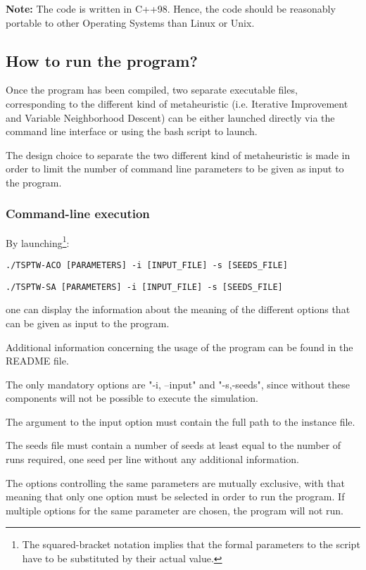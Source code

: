 \documentclass{article}
\begin{document}
\textbf{Note:} The code is written in C++98. Hence, the code should be
reasonably portable to other Operating Systems than Linux or Unix.

\subsection{How to run the program?}

Once the program has been compiled, two separate executable files,
corresponding to the different kind of metaheuristic (i.e. Iterative Improvement
and Variable Neighborhood Descent) can be either launched directly via the command line
interface or using the bash script to launch.

The design choice to separate the two different kind of metaheuristic is made in order to limit the number of command line parameters to be given as input to the program.

\subsubsection{Command-line execution}
By launching\footnote{The squared-bracket notation implies that the formal parameters to the script have to be substituted by their actual value.}:
\begin{center}
\begin{verbatim}
./TSPTW-ACO [PARAMETERS] -i [INPUT_FILE] -s [SEEDS_FILE]
\end{verbatim}
\begin{verbatim}
./TSPTW-SA [PARAMETERS] -i [INPUT_FILE] -s [SEEDS_FILE]
\end{verbatim}
\end{center}

one can display the information about the meaning of the different options that can be given as input to the program.

Additional information concerning the usage of the program can be found in the README file.

The only mandatory options are "-i, --input" and "-s,-seeds", since
without these components will not be possible to execute the simulation.

The argument to the input option must contain the full path to the instance file.

The seeds file must contain a number of seeds at least equal to the number of
runs required, one seed per line without any additional information.

The options controlling the same parameters are mutually exclusive, with that
meaning that only one option must be selected in order to run the program.
If multiple options for the same parameter are chosen, the program will not
run.
\end{document}
